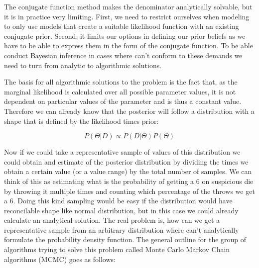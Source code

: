 \documentclass[12pt,a4paper,leqno]{report}
\theoremstyle{plain}
\theoremstyle{definition}
\theoremstyle{remark}
\begin{document}
The conjugate function method makes the denominator analytically solvable, but it
is in practice very limiting. First, we need to restrict ourselves when
modeling to only use models that create a suitable likelihood function with an existing
conjugate prior. Second, it limits our options in defining our prior
beliefs as we have to be able to express them in the form of the conjugate function. To
be able conduct Bayesian inference in cases where can't conform to these demands we need
to turn from analytic to algorithmic solutions.

The basis for all algorithmic solutions to the problem is the fact that,
as the marginal likelihood is calculated over all possible parameter values, it is
not dependent on particular values of the parameter and is thus a constant value.
Therefore we can already know that the posterior will follow a distribution
with a shape that is defined by the likelihood times prior:

\begin{def}\label{bayespropto}
    \begin{equation}
        P(\Theta|D) \propto P(D|\Theta)P(\Theta)
    \end{equation}
\end{def}

Now if we could take a representative sample of values of this distribution we could
obtain and estimate of the posterior distribution by dividing the times we obtain a
certain value (or a value range) by the total number of samples. We can think of this
as estimating what is the probability of getting a 6 on
suspicious die by throwing it multiple times and counting which percentage of the
throws we get a 6. Doing this kind sampling would be easy if the distribution would have reconcilable shape like
normal distribution, but in this case we could already calculate an analytical
solution. The real problem is, how can we get a representative sample from an arbitrary
distribution where can't analytically formulate the probability density function.
The general outline for the group of algorithms trying to solve this problem called
Monte Carlo Markov Chain algorithms (MCMC) goes as follows:
\end{document}
